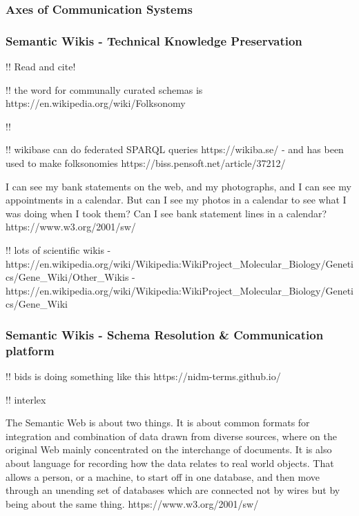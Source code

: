 \documentclass[11pt]{article}
\begin{document}
\begin{multicols}{2}
\hypertarget{axes-of-communication-systems}{%
\subsubsection{Axes of Communication
Systems}\label{axes-of-communication-systems}}

\hypertarget{semantic-wikis---technical-knowledge-preservation}{%
\subsubsection{Semantic Wikis - Technical Knowledge
Preservation}\label{semantic-wikis---technical-knowledge-preservation}}

\cite{kamelboulosSemanticWikisComprehensible2009} 

!! Read and cite! \cite{classeDistributedInfrastructureSupport2017} 

!! the word for communally curated schemas is
https://en.wikipedia.org/wiki/Folksonomy

!! \cite{goodSocialTaggingLife2009} 

!! wikibase can do federated SPARQL queries https://wikiba.se/ - and has
been used to make folksonomies https://biss.pensoft.net/article/37212/

\begin{leftbar}
I can see my bank statements on the web, and my photographs, and I can
see my appointments in a calendar. But can I see my photos in a calendar
to see what I was doing when I took them? Can I see bank statement lines
in a calendar? https://www.w3.org/2001/sw/
\end{leftbar}

!! lots of scientific wikis -
https://en.wikipedia.org/wiki/Wikipedia:WikiProject\_Molecular\_Biology/Genetics/Gene\_Wiki/Other\_Wikis
-
https://en.wikipedia.org/wiki/Wikipedia:WikiProject\_Molecular\_Biology/Genetics/Gene\_Wiki

\hypertarget{semantic-wikis---schema-resolution-communication-platform}{%
\subsubsection{Semantic Wikis - Schema Resolution \& Communication
platform}\label{semantic-wikis---schema-resolution-communication-platform}}

!! bids is doing something like this https://nidm-terms.github.io/

!! interlex

\begin{leftbar}
The Semantic Web is about two things. It is about common formats for
integration and combination of data drawn from diverse sources, where on
the original Web mainly concentrated on the interchange of documents. It
is also about language for recording how the data relates to real world
objects. That allows a person, or a machine, to start off in one
database, and then move through an unending set of databases which are
connected not by wires but by being about the same thing.
https://www.w3.org/2001/sw/
\end{leftbar}


\end{multicols}
\end{document}
